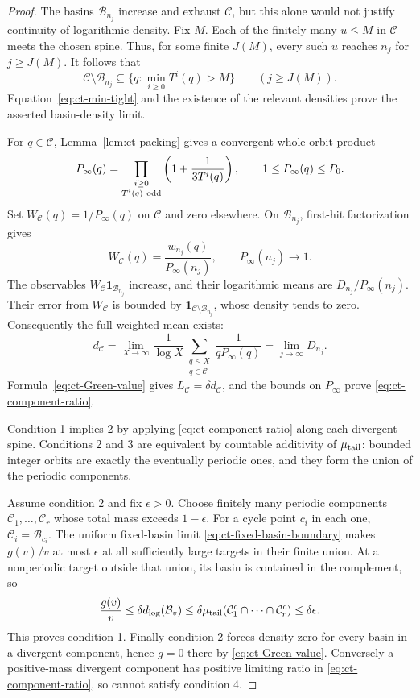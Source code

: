 \begin{proof}
The basins \(\mathcal B_{n_j}\) increase and exhaust \(\mathcal C\),
but this alone would not justify continuity of logarithmic density.
Fix \(M\). Each of the finitely many \(u\le M\) in \(\mathcal C\)
meets the chosen spine. Thus, for some finite \(J(M)\), every such
\(u\) reaches \(n_j\) for \(j\ge J(M)\). It follows that
\[
 \mathcal C\setminus\mathcal B_{n_j}
       \subseteq\{q:\min_{i\ge0}T^i(q)>M\}
                    \qquad(j\ge J(M)).
\]
Equation~\eqref{eq:ct-min-tight} and the existence of the relevant
densities prove the asserted basin-density limit.

For \(q\in\mathcal C\), Lemma~\ref{lem:ct-packing} gives a
convergent whole-orbit product
\[
 P_\infty(q)=
 \prod_{\substack{i\ge0\\T^i(q)\ {\rm odd}}}
        \left(1+\frac1{3T^i(q)}\right),
 \qquad 1\le P_\infty(q)\le P_0.
\]
Set \(W_{\mathcal C}(q)=1/P_\infty(q)\) on \(\mathcal C\) and
zero elsewhere. On \(\mathcal B_{n_j}\), first-hit factorization
gives
\[
 W_{\mathcal C}(q)=\frac{w_{n_j}(q)}{P_\infty(n_j)},
             \qquad P_\infty(n_j)\longrightarrow1.
\]
The observables
\(W_{\mathcal C}\mathbf1_{\mathcal B_{n_j}}\) increase, and
their logarithmic means are \(D_{n_j}/P_\infty(n_j)\).
Their error from \(W_{\mathcal C}\) is bounded by
\(\mathbf1_{\mathcal C\setminus\mathcal B_{n_j}}\), whose
density tends to zero. Consequently the full weighted mean exists:
\[
 d_{\mathcal C}
 =\lim_{X\to\infty}\frac1{\log X}
       \sum_{\substack{q\le X\\q\in\mathcal C}}
                       \frac1{qP_\infty(q)}
 =\lim_{j\to\infty}D_{n_j}.
\]
Formula~\eqref{eq:ct-Green-value} gives
\(L_{\mathcal C}=\delta d_{\mathcal C}\), and the bounds on
\(P_\infty\) prove \eqref{eq:ct-component-ratio}.

Condition 1 implies 2 by applying
\eqref{eq:ct-component-ratio} along each divergent spine.
Conditions 2 and 3 are equivalent by countable additivity of
\(\mu_{\rm tail}\): bounded integer orbits are exactly the
eventually periodic ones, and they form the union of the periodic
components.

Assume condition 2 and fix \(\epsilon>0\). Choose finitely many
periodic components \(\mathcal C_1,\ldots,\mathcal C_r\) whose
total mass exceeds \(1-\epsilon\). For a cycle point \(c_i\) in
each one, \(\mathcal C_i=\mathcal B_{c_i}\).
The uniform fixed-basin limit
\eqref{eq:ct-fixed-basin-boundary} makes \(g(v)/v\) at most
\(\epsilon\) at all sufficiently large targets in their finite
union. At a nonperiodic target outside that union, its basin is
contained in the complement, so
\[
 \frac{g(v)}v\le\delta d_{\log}(\mathcal B_v)
 \le\delta\mu_{\rm tail}\!\left(
          \mathcal C_1^c\cap\cdots\cap\mathcal C_r^c\right)
 \le\delta\epsilon.
\]
This proves condition 1. Finally condition 2 forces density zero
for every basin in a divergent component, hence \(g=0\) there by
\eqref{eq:ct-Green-value}. Conversely a positive-mass divergent
component has positive limiting ratio in
\eqref{eq:ct-component-ratio}, so cannot satisfy condition 4.
\end{proof}

